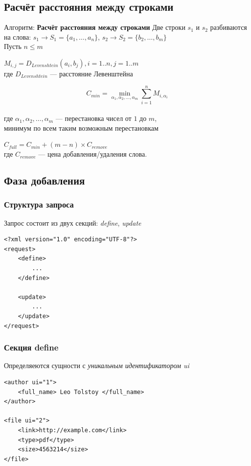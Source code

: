 \documentclass[utf8,handout]{beamer}
\begin{document}
	\subsection{Расчёт расстояния между строками}
	\begin{frame}
 		\begin{block}{Алгоритм: \textbf{Расчёт расстояния между строками}}
 			Две строки $s_{1}$ и $s_{2}$ разбиваются на слова:
 			$s_{1}\rightarrow S_{1}=\lbrace a_{1},\ldots,a_{n}\rbrace$, $s_{2}\rightarrow S_{2}=\lbrace b_{2},\ldots,b_{m}\rbrace$ \\
 			Пусть $n\leq m$

			$ M_{i,j} = D_{Levenshtein}(a_{i},b_{j}), i=1..n, j=1..m $ \\
			где $D_{Levenshtein}$ --- расстояние Левенштейна
			
			\[	C_{min}=\min_{\alpha_1, \alpha_2, \ldots, \alpha_m}{\sum_{i=1}^{n} M_{i,\alpha_{i}}} \] \\
			где $\alpha_1, \alpha_2, \ldots, \alpha_m$ --- перестановка чисел от $1$ до $m$,\\
			минимум по всем таким возможным перестановкам

			$C_{full}=C_{min}+(m-n)\times C_{remove}$\\
			где $C_{remove}$ --- цена добавления/удаления слова.
		\end{block}
	\end{frame}

	\subsection{Фаза добавления}
		\begin{frame}[fragile]
 			\frametitle{Структура запроса}
 			Запрос состоит из двух секций: {\em define}, {\em update}
 			\begin{block}{}
	 			\begin{verbatim}
<?xml version="1.0" encoding="UTF-8"?>
<request>
    <define>
        ...
    </define>

    <update>
        ...
    </update>
</request>
				\end{verbatim}
			\end{block}
		\end{frame}
	
		\begin{frame}[fragile]
 			\frametitle{Секция define}
  			Определяеются сущности с {\em уникальным идентификатором ui}
 			\begin{block}{}
	 			\begin{verbatim}
<author ui="1">
    <full_name> Leo Tolstoy </full_name>
</author>

<file ui="2">
    <link>http://example.com</link>
    <type>pdf</type>
    <size>4563214</size>
</file>
				\end{verbatim}
			\end{block}
		\end{frame}
	
\end{document}
